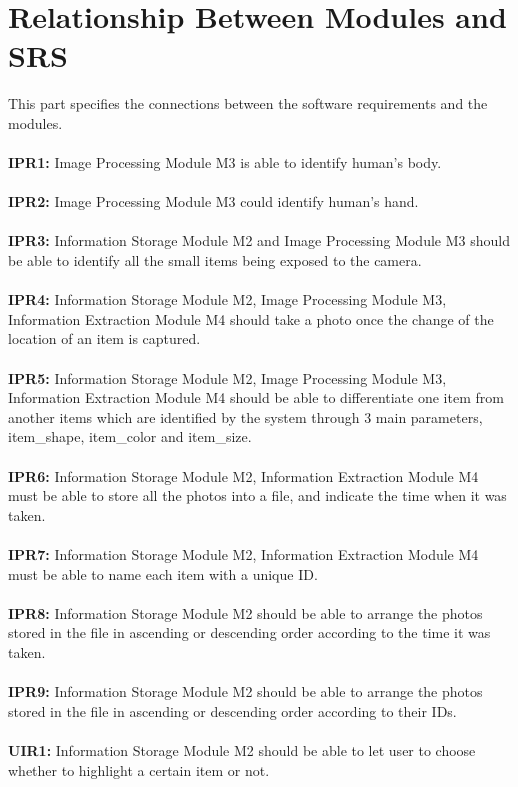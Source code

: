 \documentclass[12pt, titlepage]{article}
\begin{document}
\section{Relationship Between Modules and SRS}
This part specifies the connections between the software requirements and the modules.\\\\
\textbf{IPR1:} Image Processing Module M3 is able to identify human's body.\\\\
\textbf{IPR2:} Image Processing Module M3 could identify human's hand.\\\\
\textbf{IPR3:} Information Storage Module M2 and Image Processing Module M3 should be able to identify all the small items being exposed to the camera.\\\\
\textbf{IPR4:} Information Storage Module M2, Image Processing Module M3, Information Extraction Module M4 should take a photo once the change of the location of an item is captured.\\\\
\textbf{IPR5:} Information Storage Module M2, Image Processing Module M3, Information Extraction Module M4 should be able to differentiate one item from another items which are identified by the system through 3 main parameters, item\_shape, item\_color and item\_size.\\\\
\textbf{IPR6:} Information Storage Module M2, Information Extraction Module M4 must be able to store all the photos into a file, and indicate the time when it was taken.\\\\
\textbf{IPR7:} Information Storage Module M2, Information Extraction Module M4 must be able to name each item with a unique ID.\\\\
\textbf{IPR8:} Information Storage Module M2 should be able to arrange the photos stored in the file in ascending or descending order according to the time it was taken.\\\\
\textbf{IPR9:} Information Storage Module M2 should be able to arrange the photos stored in the file in ascending or descending order according to their IDs.\\\\
\textbf{UIR1:} Information Storage Module M2 should be able to let user to choose whether to highlight a certain item or not.\\\\
\end{document}
